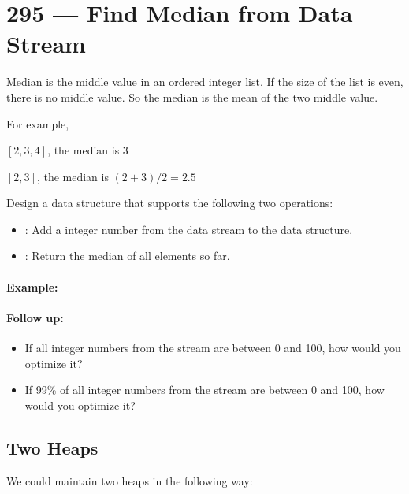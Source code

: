 \section{295 --- Find Median from Data Stream}
Median is the middle value in an ordered integer list. If the size of the list is even, there is no middle value. So the median is the mean of the two middle value.
\par
For example,
\par
$[2,3,4]$, the median is 3
\par
$[2,3]$, the median is $(2 + 3) / 2 = 2.5$
\par
Design a data structure that supports the following two operations:
\begin{itemize}
\item {}: Add a integer number from the data stream to the data structure.
\item {}: Return the median of all elements so far.
\end{itemize}
 

\paragraph{Example:}

\begin{flushleft}






\end{flushleft}

\paragraph{Follow up:}

\begin{itemize}
\item If all integer numbers from the stream are between 0 and 100, how would you optimize it?
\item If 99\% of all integer numbers from the stream are between 0 and 100, how would you optimize it?
\end{itemize}

\subsection{Two Heaps}
We could maintain two heaps in the following way:

